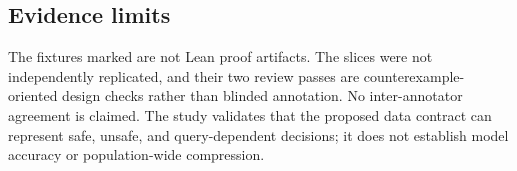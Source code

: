 \subsection{Evidence limits}

The fixtures marked  are not Lean proof artifacts. The slices were not independently replicated, and their two review passes are counterexample-oriented design checks rather than blinded annotation. No inter-annotator agreement is claimed. The study validates that the proposed data contract can represent safe, unsafe, and query-dependent decisions; it does not establish model accuracy or population-wide compression.